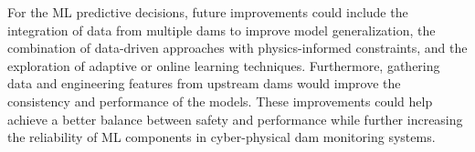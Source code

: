 For the ML predictive decisions, future improvements could include the integration of data from multiple dams to improve model generalization, the combination of data-driven approaches with physics-informed constraints, and the exploration of adaptive or online learning techniques. Furthermore, gathering data and engineering features from upstream dams would improve the consistency and performance of the models. These improvements could help achieve a better balance between safety and performance while further increasing the reliability of ML components in cyber-physical dam monitoring systems.

